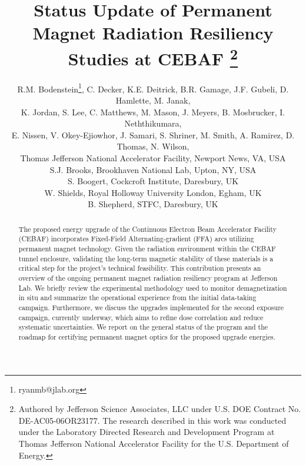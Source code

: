 \documentclass[a4paper,
               ]{jacow}
\begin{document}
\title{Status Update of Permanent Magnet Radiation Resiliency Studies at CEBAF%
\thanks{Authored by Jefferson Science Associates, LLC under U.S. DOE Contract No. DE-AC05-06OR23177. The research described in this work was conducted under the Laboratory Directed Research and Development Program at Thomas Jefferson National Accelerator Facility for the U.S. Department of Energy.}}

\author{R.M. Bodenstein\thanks{ryanmb@jlab.org}, C. Decker, K.E. Deitrick, B.R. Gamage, J.F. Gubeli, D. Hamlette, M. Janak,\\ K. Jordan, S. Lee, C. Matthews, M. Mason, J. Meyers, B. Mosbrucker, I. Neththikumara,\\  E. Nissen, V. Okey-Ejiowhor, J. Samari, S. Shriner, M. Smith, A. Ramirez, D. Thomas, N. Wilson,\\ Thomas Jefferson National Accelerator Facility, Newport News, VA, USA \\
S.J. Brooks, Brookhaven National Lab, Upton, NY, USA \\
S. Boogert, Cockcroft Institute, Daresbury, UK\\
W. Shields, Royal Holloway University London, Egham, UK\\
B. Shepherd, STFC, Daresbury, UK
    }

\maketitle

%
\begin{abstract}
The proposed energy upgrade of the Continuous Electron Beam Accelerator Facility (CEBAF) incorporates Fixed-Field Alternating-gradient (FFA) arcs utilizing permanent magnet technology. Given the radiation environment within the CEBAF tunnel enclosure, validating the long-term magnetic stability of these materials is a critical step for the project's technical feasibility. This contribution presents an overview of the ongoing permanent magnet radiation resiliency program at Jefferson Lab. We briefly review the experimental methodology used to monitor demagnetization in situ and summarize the operational experience from the initial data-taking campaign. Furthermore, we discuss the upgrades implemented for the second exposure campaign, currently underway, which aims to refine dose correlation and reduce systematic uncertainties. We report on the general status of the program and the roadmap for certifying permanent magnet optics for the proposed upgrade energies.
\end{abstract}
\end{document}
